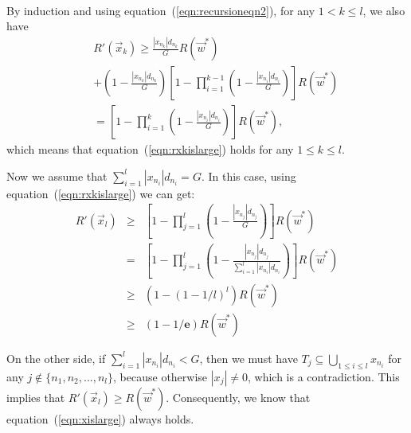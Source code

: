 \documentclass[10pt,journal,compsoc]{IEEEtran}
\begin{document}
\begin{IEEEproof}
\begin{eqnarray}
\end{eqnarray}
By induction and using equation~(\ref{eqn:recursioneqn2}), for any $1<k\leq l$, we also have
\begin{eqnarray}
&&R'(\vec{x}_{k})
\geq \frac{|x_{n_{k}}|d_{n_{k}}}{G}R(\vec{w}^*) \nonumber\\
&&+\left(1-\frac{|x_{n_{k}}|d_{n_{k}}}{G}\right)\left[1-\prod_{i=1}^{k-1} \left(1-\frac{|x_{n_i}|d_{n_i}}{G}\right)\right]R(\vec{w}^*) \nonumber\\
&&=\left[1-\prod_{i=1}^{k} \left(1-\frac{|x_{n_i}|d_{n_i}}{G}\right)\right]R(\vec{w}^*), \nonumber
\end{eqnarray}
which means that equation~(\ref{eqn:rxkislarge}) holds for any $1\leq k\leq l$.

Now we assume that $\sum_{i=1}^l|x_{n_i}|d_{n_i}=G$. In this case, using equation~(\ref{eqn:rxkislarge}) we can get:
\begin{eqnarray}
R'(\vec{x}_l)&\geq& \left[1-\prod\nolimits_{j=1}^l \left(1-\frac{{|x_{n_j}|d_{n_j}}}{G}\right)\right]R(\vec{w}^*)\nonumber\\
&=& \left[1-\prod_{j=1}^l \left(1-\frac{|x_{n_j}|d_{n_j}}{\sum_{i=1}^l|x_{n_i}|d_{n_i}}\right)\right]R(\vec{w}^*)\nonumber\\
&\geq& \left(1-(1-{1}/{l})^l\right)R(\vec{w}^*)\nonumber\\
&\geq& (1-{1}/\mathbf{e})R(\vec{w}^*) \label{eqn:xislarge}
\end{eqnarray}

On the other side, if $\sum_{i=1}^l|x_{n_i}|d_{n_i}<G$, then we must have $T_j\subseteq \bigcup_{1\leq i\leq l}x_{n_i}$ for any $j\notin \{n_1,n_2,...,n_l\}$, because otherwise $|x_j|\neq 0$, which is a contradiction. This implies that $R'(\vec{x}_l)\geq R(\vec{w}^*)$. Consequently, we know that equation~(\ref{eqn:xislarge}) always holds.



\end{IEEEproof}
\end{document}
